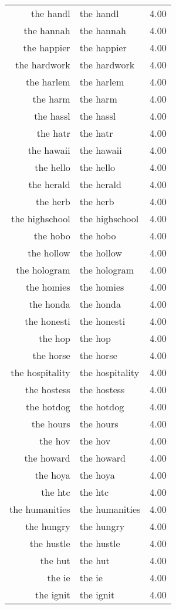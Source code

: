 \begin{table}[ht]
\begin{tabular}{rlr}
  the handl & the handl & 4.00 \\ 
  the hannah & the hannah & 4.00 \\ 
  the happier & the happier & 4.00 \\ 
  the hardwork & the hardwork & 4.00 \\ 
  the harlem & the harlem & 4.00 \\ 
  the harm & the harm & 4.00 \\ 
  the hassl & the hassl & 4.00 \\ 
  the hatr & the hatr & 4.00 \\ 
  the hawaii & the hawaii & 4.00 \\ 
  the hello & the hello & 4.00 \\ 
  the herald & the herald & 4.00 \\ 
  the herb & the herb & 4.00 \\ 
  the highschool & the highschool & 4.00 \\ 
  the hobo & the hobo & 4.00 \\ 
  the hollow & the hollow & 4.00 \\ 
  the hologram & the hologram & 4.00 \\ 
  the homies & the homies & 4.00 \\ 
  the honda & the honda & 4.00 \\ 
  the honesti & the honesti & 4.00 \\ 
  the hop & the hop & 4.00 \\ 
  the horse & the horse & 4.00 \\ 
  the hospitality & the hospitality & 4.00 \\ 
  the hostess & the hostess & 4.00 \\ 
  the hotdog & the hotdog & 4.00 \\ 
  the hours & the hours & 4.00 \\ 
  the hov & the hov & 4.00 \\ 
  the howard & the howard & 4.00 \\ 
  the hoya & the hoya & 4.00 \\ 
  the htc & the htc & 4.00 \\ 
  the humanities & the humanities & 4.00 \\ 
  the hungry & the hungry & 4.00 \\ 
  the hustle & the hustle & 4.00 \\ 
  the hut & the hut & 4.00 \\ 
  the ie & the ie & 4.00 \\ 
  the ignit & the ignit & 4.00 \\ 

\end{tabular}
\end{table}
